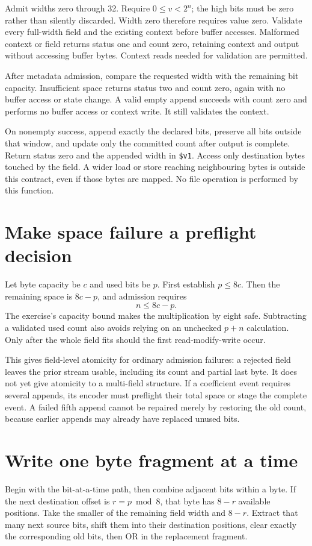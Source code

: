Admit widths zero through 32. Require $0\leq v<2^n$; the high bits must be zero
rather than silently discarded. Width zero therefore requires value zero.
Validate every full-width field and the existing context before buffer accesses.
Malformed context or field returns status one and count zero, retaining context
and output without accessing buffer bytes. Context reads needed for validation
are permitted.

After metadata admission, compare the requested width with the remaining bit
capacity. Insufficient space returns status two and count zero, again with no
buffer access or state change. A valid empty append succeeds with count zero
and performs no buffer access or context write. It still validates the context.

On nonempty success, append exactly the declared bits, preserve all bits outside
that window, and update only the committed count after output is complete.
Return status zero and the appended width in \texttt{\$v1}. Access only destination
bytes touched by the field. A wider load or store reaching neighbouring bytes
is outside this contract, even if those bytes are mapped. No file operation is
performed by this function.

\section{Make space failure a preflight decision}
Let byte capacity be $c$ and used bits be $p$. First establish $p\leq8c$.
Then the remaining space is $8c-p$, and admission requires
\[
 n\leq8c-p.
\]
The exercise's capacity bound makes the multiplication by eight safe. Subtracting
a validated used count also avoids relying on an unchecked $p+n$ calculation.
Only after the whole field fits should the first read-modify-write occur.

This gives field-level atomicity for ordinary admission failures: a rejected
field leaves the prior stream usable, including its count and partial last byte.
It does not yet give atomicity to a multi-field structure. If a coefficient event
requires several appends, its encoder must preflight their total space or stage
the complete event. A failed fifth append cannot be repaired merely by restoring
the old count, because earlier appends may already have replaced unused bits.

\section{Write one byte fragment at a time}
Begin with the bit-at-a-time path, then combine adjacent bits within a byte.
If the next destination offset is $r=p\bmod8$, that byte has $8-r$ available
positions. Take the smaller of the remaining field width and $8-r$. Extract
that many next source bits, shift them into their destination positions, clear
exactly the corresponding old bits, then OR in the replacement fragment.

